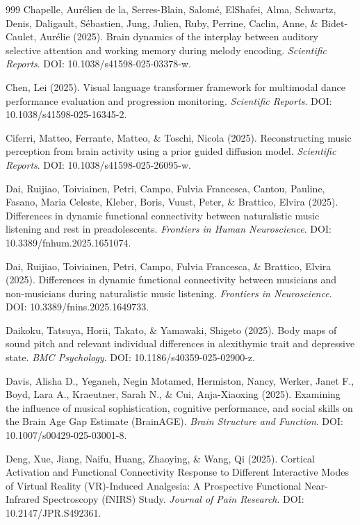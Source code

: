 \documentclass[9pt,onecolumn]{article}
\begin{document}
\begin{thebibliography}{999}
Chapelle, Aurélien de la, Serres-Blain, Salomé, ElShafei, Alma, Schwartz, Denis, Daligault, Sébastien, Jung, Julien, Ruby, Perrine, Caclin, Anne, \& Bidet-Caulet, Aurélie (2025). Brain dynamics of the interplay between auditory selective attention and working memory during melody encoding. \textit{Scientific Reports}. DOI: 10.1038/s41598-025-03378-w.

Chen, Lei (2025). Visual language transformer framework for multimodal dance performance evaluation and progression monitoring. \textit{Scientific Reports}. DOI: 10.1038/s41598-025-16345-2.

Ciferri, Matteo, Ferrante, Matteo, \& Toschi, Nicola (2025). Reconstructing music perception from brain activity using a prior guided diffusion model. \textit{Scientific Reports}. DOI: 10.1038/s41598-025-26095-w.

Dai, Ruijiao, Toiviainen, Petri, Campo, Fulvia Francesca, Cantou, Pauline, Fasano, Maria Celeste, Kleber, Boris, Vuust, Peter, \& Brattico, Elvira (2025). Differences in dynamic functional connectivity between naturalistic music listening and rest in preadolescents. \textit{Frontiers in Human Neuroscience}. DOI: 10.3389/fnhum.2025.1651074.

Dai, Ruijiao, Toiviainen, Petri, Campo, Fulvia Francesca, \& Brattico, Elvira (2025). Differences in dynamic functional connectivity between musicians and non-musicians during naturalistic music listening. \textit{Frontiers in Neuroscience}. DOI: 10.3389/fnins.2025.1649733.

Daikoku, Tatsuya, Horii, Takato, \& Yamawaki, Shigeto (2025). Body maps of sound pitch and relevant individual differences in alexithymic trait and depressive state. \textit{BMC Psychology}. DOI: 10.1186/s40359-025-02900-z.

Davis, Alisha D., Yeganeh, Negin Motamed, Hermiston, Nancy, Werker, Janet F., Boyd, Lara A., Kraeutner, Sarah N., \& Cui, Anja-Xiaoxing (2025). Examining the influence of musical sophistication, cognitive performance, and social skills on the Brain Age Gap Estimate (BrainAGE). \textit{Brain Structure and Function}. DOI: 10.1007/s00429-025-03001-8.

Deng, Xue, Jiang, Naifu, Huang, Zhaoying, \& Wang, Qi (2025). Cortical Activation and Functional Connectivity Response to Different Interactive Modes of Virtual Reality (VR)-Induced Analgesia: A Prospective Functional Near-Infrared Spectroscopy (fNIRS) Study. \textit{Journal of Pain Research}. DOI: 10.2147/JPR.S492361.


\end{thebibliography}
\end{document}
